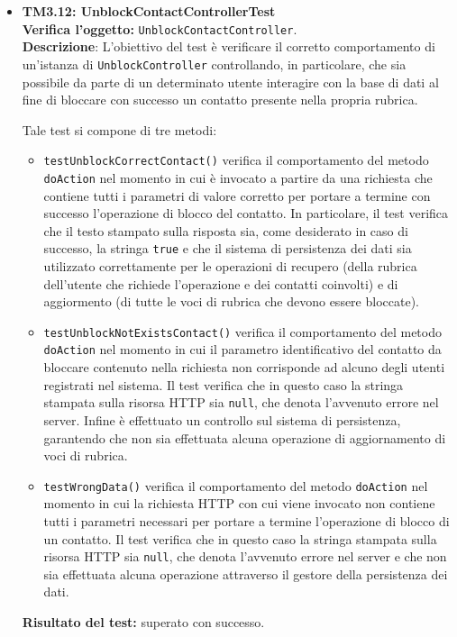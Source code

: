 \begin{itemize}
\item[\passed] \textbf{TM3.12: UnblockContactControllerTest}\\
\textbf{Verifica l'oggetto:} \texttt{UnblockContactController}.\\
\textbf{Descrizione}: L'obiettivo del test è verificare il corretto comportamento di un'istanza di \texttt{UnblockController} controllando, in particolare, che sia possibile da parte di un determinato utente interagire con la base di dati al fine di bloccare con successo un contatto presente nella propria rubrica.

Tale test si compone di tre metodi:
\begin{itemize}
\item \texttt{testUnblockCorrectContact()} verifica il comportamento del metodo \texttt{doAction} nel momento in cui è invocato a partire da una richiesta che contiene tutti i parametri di valore corretto per portare a termine con successo l'operazione di blocco del contatto. In particolare, il test verifica che il testo stampato sulla risposta sia, come desiderato in caso di successo, la stringa \texttt{true} e che il sistema di persistenza dei dati sia utilizzato correttamente per le operazioni di recupero (della rubrica dell'utente che richiede l'operazione e dei contatti coinvolti) e di aggiormento (di tutte le voci di rubrica che devono essere bloccate).

\item \texttt{testUnblockNotExistsContact()} verifica il comportamento del metodo \texttt{doAction} nel momento in cui il parametro identificativo del contatto da bloccare contenuto nella richiesta non corrisponde ad alcuno degli utenti registrati nel sistema.
Il test verifica che in questo caso la stringa stampata sulla risorsa HTTP sia \texttt{null}, che denota l'avvenuto errore nel server. Infine è effettuato un controllo sul sistema di persistenza, garantendo che non sia effettuata alcuna operazione di aggiornamento di voci di rubrica.

\item \texttt{testWrongData()} verifica il comportamento del metodo \texttt{doAction} nel momento in cui la richiesta HTTP con cui viene invocato non contiene tutti i parametri necessari per portare a termine l'operazione di blocco di un contatto.
Il test verifica che in questo caso la stringa stampata sulla risorsa HTTP sia \texttt{null}, che denota l'avvenuto errore nel server e che non sia effettuata alcuna operazione attraverso il gestore della persistenza dei dati.

\end{itemize}
\textbf{Risultato del test:} superato con successo.

\end{itemize}


